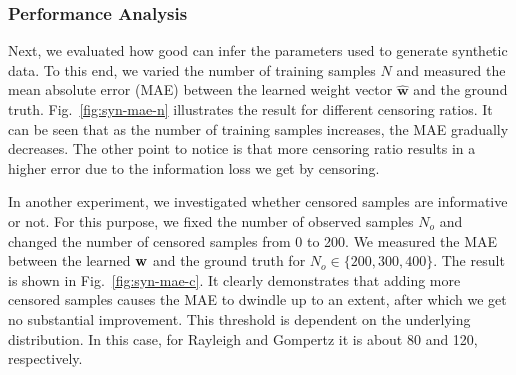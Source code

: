 \subsubsection{Performance Analysis}
Next, we evaluated how good \npglm can infer the parameters used to generate synthetic data. To this end, we varied the number of training samples $N$ and measured the mean absolute error (MAE) between the learned weight vector $\hat{\mathbf{w}}$ and the ground truth. Fig.~\ref{fig:syn-mae-n} illustrates the result for different censoring ratios. It can be seen that as the number of training samples increases, the MAE gradually decreases. The other point to notice is that more censoring ratio results in a higher error due to the information loss we get by censoring.

In another experiment, we investigated whether censored samples are informative or not. For this purpose, we fixed the number of observed samples $N_o$ and changed the number of censored samples from 0 to 200. We measured the MAE between the learned $\mathbf{w}$ and the ground truth for $N_o\in\{200,300,400\}$. The result is shown in Fig.~\ref{fig:syn-mae-c}. It clearly demonstrates that adding more censored samples causes the MAE to dwindle up to an extent, after which we get no substantial improvement. This threshold is dependent on the underlying distribution. In this case, for Rayleigh and Gompertz it is about 80 and 120, respectively.

